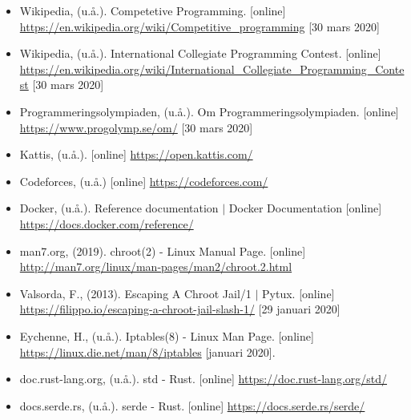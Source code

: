 \documentclass{article}
\begin{document}
\begin{itemize}
	\item Wikipedia, (u.å.). Competetive Programming. [online]
		\url{https://en.wikipedia.org/wiki/Competitive_programming}
		[30 mars 2020]

	\item Wikipedia, (u.å.). International Collegiate Programming Contest.
		[online] \url{https://en.wikipedia.org/wiki/International_Collegiate_Programming_Contest}
		[30 mars 2020]

	\item Programmeringsolympiaden, (u.å.). Om Programmeringsolympiaden.
		[online] \url{https://www.progolymp.se/om/} [30 mars 2020]

	\item Kattis, (u.å.). [online] \url{https://open.kattis.com/}

	\item Codeforces, (u.å.) [online] \url{https://codeforces.com/}

	\item Docker, (u.å.). Reference documentation $|$ Docker Documentation
		[online] \url{https://docs.docker.com/reference/}


	\item man7.org, (2019). chroot(2) - Linux Manual Page. [online]
		\url{http://man7.org/linux/man-pages/man2/chroot.2.html}

	\item Valsorda, F., (2013). Escaping A Chroot Jail/1 $|$ Pytux. [online]
		\url{https://filippo.io/escaping-a-chroot-jail-slash-1/}
		[29 januari 2020]

	\item Eychenne, H., (u.å.). Iptables(8) - Linux Man Page. [online]
		\url{https://linux.die.net/man/8/iptables} [januari 2020].


	\item doc.rust-lang.org, (u.å.). std - Rust. [online]
		\url{https://doc.rust-lang.org/std/}

	\item docs.serde.rs, (u.å.). serde - Rust. [online]
		\url{https://docs.serde.rs/serde/}



\end{itemize}
\end{document}
